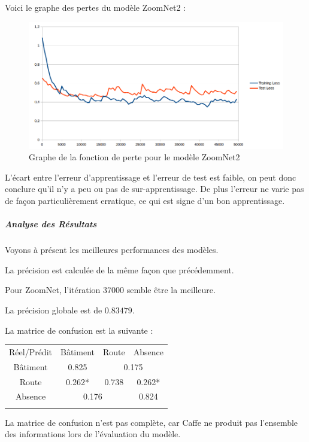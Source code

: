 \documentclass[a4paper, 11pt]{report}
\begin{document}
Voici le graphe des pertes du modèle ZoomNet2 :
\begin{figure}[H]
	\begin{center}
		\includegraphics[scale=0.6]{Images/Losses_ZoomNet2.png}
		\caption{Graphe de la fonction de perte pour le modèle ZoomNet2}
	\end{center}
\end{figure}
L'écart entre l'erreur d'apprentissage et l'erreur de test est faible, on peut donc conclure qu'il n'y a peu ou pas de sur-apprentissage.
De plus l'erreur ne varie pas de façon particulièrement erratique, ce qui est signe d'un bon apprentissage.
\subparagraph{Analyse des Résultats}
Voyons à présent les meilleures performances des modèles.

La précision est calculée de la même façon que précédemment.

Pour ZoomNet, l'itération 37000 semble être la meilleure.

La précision globale est de $0.83479$.

La matrice de confusion est la suivante :
\begin{center}
	\begin{tabularx}{0.5\textwidth}{c|c c c|}
		Réel/Prédit & Bâtiment & Route & Absence \\
		\hhline{----}
		Bâtiment & 0.825 \cellcolor[gray]{.8} & \multicolumn{2}{c|}{0.175} \\
		Route & 0.262* & 0.738 \cellcolor[gray]{.8} & 0.262*\\
		Absence & \multicolumn{2}{c}{0.176} & 0.824 \cellcolor[gray]{.8}\\
		\hhline{~---}
	\end{tabularx}
\end{center}

La matrice de confusion n'est pas complète, car Caffe ne produit pas l'ensemble des informations lors de l'évaluation du modèle.
\end{document}
